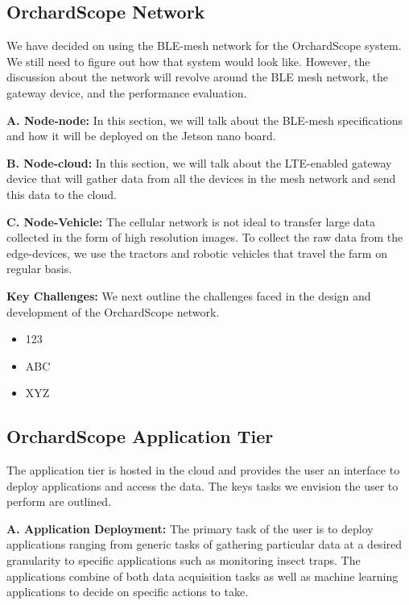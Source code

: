 \subsection{OrchardScope Network}
We have decided on using the BLE-mesh network for the OrchardScope system. We still need to figure out how that system would look like. However, the discussion about the network will revolve around the BLE mesh network, the gateway device, and the performance evaluation. 

\noindent
\textbf{A. Node-node:} In this section, we will talk about the BLE-mesh specifications and how it will be deployed on the Jetson nano board. 

\noindent
\textbf{B. Node-cloud:} In this section, we will talk about the LTE-enabled gateway device that will gather data from all the devices in the mesh network and send this data to the cloud. 

\noindent
\textbf{C. Node-Vehicle:} The cellular network is not ideal to transfer large data collected in the form of high resolution images. To collect the raw data from the edge-devices, we use the tractors and robotic vehicles that travel the farm on regular basis. 

\noindent
\textbf{Key Challenges:} We next outline the challenges faced in the design and development of the OrchardScope network. 
\begin{itemize}
    \item 123
    \item ABC
    \item XYZ 
\end{itemize}

\subsection{OrchardScope Application Tier}

The application tier is hosted in the cloud and provides the user an interface to deploy applications and access the data. The keys tasks we envision the user to perform are outlined. 

\noindent
\textbf{A. Application Deployment:} The primary task of the user is to deploy applications ranging from generic tasks of gathering particular data at a desired granularity to specific applications such as monitoring insect traps. The applications combine of both data acquisition tasks as well as machine learning applications to decide on specific actions to take. 

